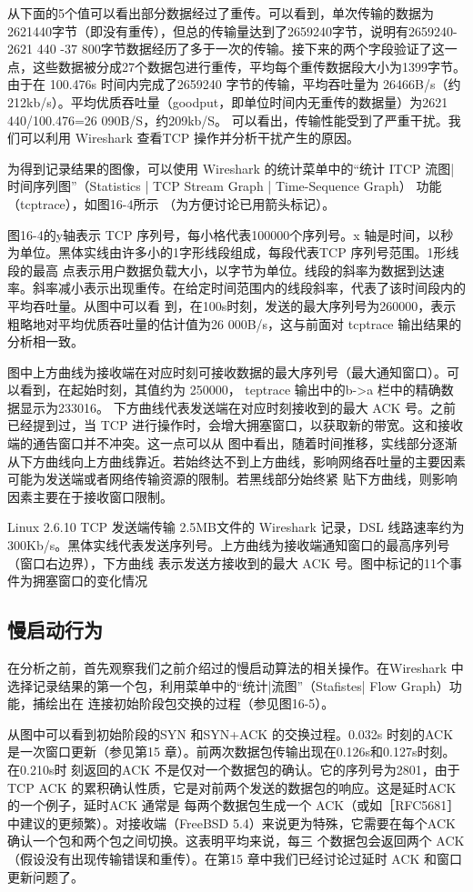 从下面的5个值可以看出部分数据经过了重传。可以看到，单次传输的数据为2621440字节（即没有重传），但总的传输量达到了2659240字节，说明有2659240-
2621 440 -37 800字节数据经历了多于一次的传输。接下来的两个字段验证了这一点，这些数据被分成27个数据包进行重传，平均每个重传数据段大小为1399字节。由于在 100.476s
时间内完成了2659240 字节的传输，平均吞吐量为 26466B/s（约212kb/s）。平均优质吞吐量（goodput，即单位时间内无重传的数据量）为2621 440/100.476=26 090B/S，约209kb/S。
可以看出，传输性能受到了严重干扰。我们可以利用 Wireshark 查看TCP 操作并分析干扰产生的原因。

为得到记录结果的图像，可以使用 Wireshark 的统计菜单中的“统计 ITCP 流图| 时间序列图”（Statistics | TCP Stream Graph | Time-Sequence Graph） 功能（tcptrace），如图16-4所示
（为方便讨论已用箭头标记）。

图16-4的y轴表示 TCP 序列号，每小格代表100000个序列号。x 轴是时间，以秒为单位。黑体实线由许多小的1字形线段组成，每段代表TCP 序列号范围。1形线段的最高
点表示用户数据负载大小，以字节为单位。线段的斜率为数据到达速率。斜率减小表示出现重传。在给定时间范围内的线段斜率，代表了该时间段内的平均吞吐量。从图中可以看
到，在100s时刻，发送的最大序列号为260000，表示粗略地对平均优质吞吐量的估计值为26 000B/s，这与前面对 tcptrace 输出结果的分析相一致。

图中上方曲线为接收端在对应时刻可接收数据的最大序列号（最大通知窗口）。可以看到，在起始时刻，其值约为 250000， teptrace 输出中的b->a 栏中的精确数据显示为233016。
下方曲线代表发送端在对应时刻接收到的最大 ACK 号。之前已经提到过，当 TCP 进行操作时，会增大拥塞窗口，以获取新的带宽。这和接收端的通告窗口并不冲突。这一点可以从
图中看出，随着时间推移，实线部分逐渐从下方曲线向上方曲线靠近。若始终达不到上方曲线，影响网络吞吐量的主要因素可能为发送端或者网络传输资源的限制。若黑线部分始终紧
贴下方曲线，则影响因素主要在于接收窗口限制。

Linux 2.6.10 TCP 发送端传输 2.5MB文件的 Wireshark 记录，DSL 线路速率约为300Kb/s。黑体实线代表发送序列号。上方曲线为接收端通知窗口的最高序列号（窗口右边界），下方曲线
表示发送方接收到的最大 ACK 号。图中标记的11个事件为拥塞窗口的变化情况

\subsection{慢启动行为}
在分析之前，首先观察我们之前介绍过的慢启动算法的相关操作。在Wireshark 中选择记录结果的第一个包，利用菜单中的“统计|流图”（Stafistes| Flow Graph）功能，捕绘出在
连接初始阶段包交换的过程（参见图16-5）。

从图中可以看到初始阶段的SYN 和SYN+ACK 的交换过程。0.032s 时刻的ACK 是一次窗口更新（参见第15 章）。前两次数据包传输出现在0.126s和0.127s时刻。在0.210s时
刻返回的ACK 不是仅对一个数据包的确认。它的序列号为2801，由于 TCP ACK 的累积确认性质，它是对前两个发送的数据包的响应。这是延时ACK 的一个例子，延时ACK 通常是
每两个数据包生成一个 ACK（或如［RFC5681］ 中建议的更频繁）。对接收端（FreeBSD 5.4）来说更为特殊，它需要在每个ACK 确认一个包和两个包之间切换。这表明平均来说，每三
个数据包会返回两个 ACK（假设没有出现传输错误和重传）。在第15 章中我们已经讨论过延时 ACK 和窗口更新问题了。

